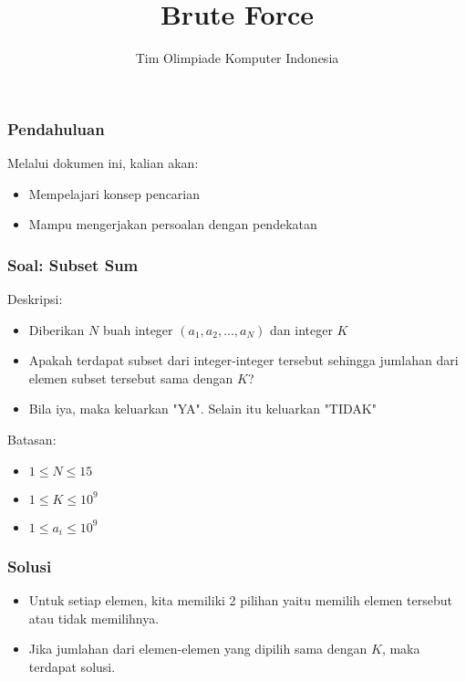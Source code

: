 

\title{Brute Force}
\author{Tim Olimpiade Komputer Indonesia}
\date{}



\begin{frame}
\titlepage
\end{frame}

\begin{frame}
\frametitle{Pendahuluan}
Melalui dokumen ini, kalian akan:
\begin{itemize}
  \item Mempelajari konsep pencarian 
  \item Mampu mengerjakan persoalan dengan pendekatan 
\end{itemize}

\end{frame}

\begin{frame}
\frametitle{Soal: Subset Sum}
Deskripsi:
\begin{itemize}
  \item Diberikan $N$ buah integer $(a_1, a_2, ..., a_N)$ dan integer $K$
  \item Apakah terdapat subset dari integer-integer tersebut sehingga jumlahan dari elemen subset tersebut sama dengan $K$? 
  \item Bila iya, maka keluarkan "YA". Selain itu keluarkan "TIDAK"
\end{itemize}

Batasan:
\begin{itemize} 
  \item $1 \leq N \leq 15$
  \item $1 \leq K \leq 10^9$
  \item $1 \leq a_i \leq 10^9$
\end{itemize}

\end{frame}

\begin{frame}
\frametitle{Solusi}
\begin{itemize}
  \item Untuk setiap elemen, kita memiliki 2 pilihan yaitu memilih elemen tersebut atau tidak memilihnya.
  \item Jika jumlahan dari elemen-elemen yang dipilih sama dengan $K$, maka terdapat solusi.
\end{itemize}
\end{frame}

